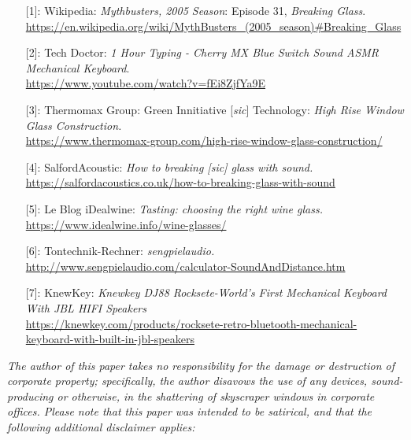 \documentclass{article}
\begin{document}
\begin{itemize}
    \item[] [1]: Wikipedia: \emph{Mythbusters, 2005 Season}: Episode 31, \emph{Breaking Glass}. \\ \href{https://en.wikipedia.org/wiki/MythBusters\_(2005\_season)\#Breaking\_Glass}{https://en.wikipedia.org/wiki/MythBusters\_(2005\_season)\#Breaking\_Glass}
    \item[] [2]: Tech Doctor: \emph{1 Hour Typing - Cherry MX Blue Switch Sound ASMR Mechanical Keyboard}. \\ \href{https://www.youtube.com/watch?v=fEi8ZjfYa9E}{https://www.youtube.com/watch?v=fEi8ZjfYa9E}
    \item[] [3]: Thermomax Group: Green Innitiative [\emph{sic}] Technology: \emph{High Rise Window Glass Construction.} \\ \href{https://www.thermomax-group.com/high-rise-window-glass-construction/}{https://www.thermomax-group.com/high-rise-window-glass-construction/}
    \item[] [4]: SalfordAcoustic: \emph{How to breaking [\emph{sic}] glass with sound.}\\ \href{https://salfordacoustics.co.uk/how-to-breaking-glass-with-sound}{https://salfordacoustics.co.uk/how-to-breaking-glass-with-sound}\
    \item[] [5]: Le Blog iDealwine: \emph{Tasting: choosing the right wine glass.} \\ \href{https://www.idealwine.info/wine-glasses/}{https://www.idealwine.info/wine-glasses/}
    \item[] [6]: Tontechnik-Rechner: \emph{sengpielaudio.} \\ \href{http://www.sengpielaudio.com/calculator-SoundAndDistance.htm}{http://www.sengpielaudio.com/calculator-SoundAndDistance.htm}
    \item[] [7]: KnewKey: \emph{Knewkey DJ88 Rocksete-World's First Mechanical Keyboard With JBL HIFI Speakers} \\ \href{https://knewkey.com/products/rocksete-retro-bluetooth-mechanical-keyboard-with-built-in-jbl-speakers}{https://knewkey.com/products/rocksete-retro-bluetooth-mechanical-keyboard-with-built-in-jbl-speakers}
\end{itemize}

\vfill

\setlength{\parindent}{0pt}

\small \emph{The author of this paper takes no responsibility for the damage or destruction of corporate property; specifically, the author disavows the use of any devices, sound-producing or otherwise, in the shattering of skyscraper windows in corporate offices. Please note that this paper was intended to be satirical, and that the following additional disclaimer applies:} \\
\end{document}
